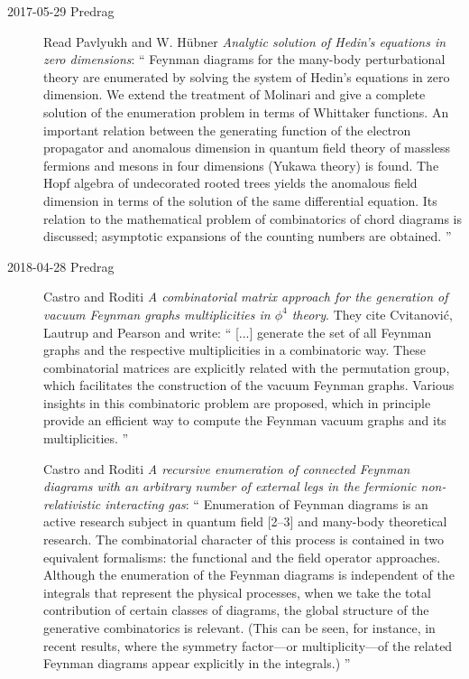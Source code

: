 \begin{description}
\item[2017-05-29 Predrag] Read
Pavlyukh and W. H{\"u}bner
{\em Analytic solution of {Hedin's} equations in zero dimensions}: ``
Feynman diagrams for the many-body perturbational theory are enumerated
by solving the system of Hedin's equations in zero dimension. We extend
the treatment of Molinari and give a
complete solution of the enumeration problem in terms of Whittaker
functions. An important relation between the generating function of the
electron propagator and anomalous dimension in quantum field theory of
massless fermions and mesons in four dimensions (Yukawa theory) is found.
The Hopf algebra of undecorated rooted trees yields the anomalous field
dimension in terms of the solution of the same differential equation. Its
relation to the mathematical problem of combinatorics of chord diagrams
is discussed; asymptotic expansions of the counting numbers are obtained.
''

\item[2018-04-28 Predrag]
Castro and Roditi {\em A combinatorial matrix approach for the
generation of vacuum {Feynman} graphs multiplicities in {$\phi^4$} theory}.
They cite Cvitanovi\'c, Lautrup and Pearson and write: ``
[...] generate the set of all Feynman graphs and the respective multiplicities in a
combinatoric way. These combinatorial matrices are explicitly
related with the permutation group, which facilitates the construction of the
vacuum Feynman graphs. Various insights in this combinatoric problem are
proposed, which in principle provide an efficient way to compute the Feynman
vacuum graphs and its multiplicities.
''

Castro and Roditi {\em A recursive enumeration of connected
{Feynman} diagrams with an arbitrary number of external legs in the
fermionic non-relativistic interacting gas}: ``
Enumeration of Feynman diagrams is an active research subject in quantum
field [2–3] and many-body theoretical
research. The combinatorial character of
this process is contained in two equivalent formalisms: the functional
and the field operator approaches. Although the enumeration of the
Feynman diagrams is independent of the integrals that represent the
physical processes, when we take the total contribution of certain
classes of diagrams, the global structure of the generative combinatorics
is relevant. (This can be seen, for instance, in recent
results, where the symmetry factor—or multiplicity—of the
related Feynman diagrams appear explicitly in the integrals.)
''


\end{description}
